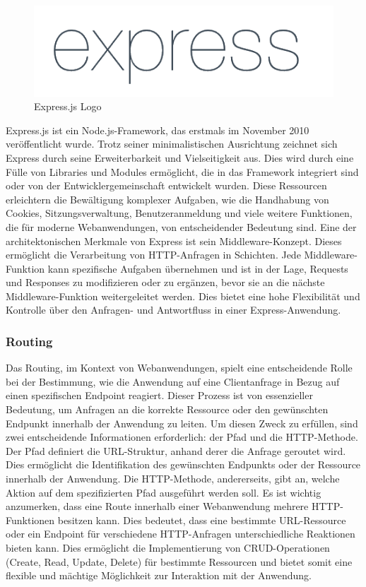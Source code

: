 \begin{figure}[h!]
    \centering
    \includegraphics[width=0.8\linewidth]{pics/express_logo.png}
    \caption{Express.js Logo}
    \label{fig:enter-label}
\end{figure}
Express.js ist ein Node.js-Framework, das erstmals im November 2010 veröffentlicht wurde. Trotz seiner minimalistischen Ausrichtung zeichnet sich Express durch seine Erweiterbarkeit und Vielseitigkeit aus. Dies wird durch eine Fülle von Libraries und Modules ermöglicht, die in das Framework integriert sind oder von der Entwicklergemeinschaft entwickelt wurden. Diese Ressourcen erleichtern die Bewältigung komplexer Aufgaben, wie die Handhabung von Cookies, Sitzungsverwaltung, Benutzeranmeldung und viele weitere Funktionen, die für moderne Webanwendungen, von entscheidender Bedeutung sind.
\newline
Eine der architektonischen Merkmale von Express ist sein Middleware-Konzept. Dieses ermöglicht die Verarbeitung von HTTP-Anfragen in Schichten. Jede Middleware-Funktion kann spezifische Aufgaben übernehmen und ist in der Lage, Requests und Responses zu modifizieren oder zu ergänzen, bevor sie an die nächste Middleware-Funktion weitergeleitet werden. Dies bietet eine hohe Flexibilität und Kontrolle über den Anfragen- und Antwortfluss in einer Express-Anwendung.
\cite{Express_js_Introduction}

\subsubsection{Routing}
Das Routing, im Kontext von Webanwendungen, spielt eine entscheidende Rolle bei der Bestimmung, wie die Anwendung auf eine Clientanfrage in Bezug auf einen spezifischen Endpoint reagiert. Dieser Prozess ist von essenzieller Bedeutung, um Anfragen an die korrekte Ressource oder den gewünschten Endpunkt innerhalb der Anwendung zu leiten. Um diesen Zweck zu erfüllen, sind zwei entscheidende Informationen erforderlich: der Pfad und die HTTP-Methode.
\newline
Der Pfad definiert die URL-Struktur, anhand derer die Anfrage geroutet wird. Dies ermöglicht die Identifikation des gewünschten Endpunkts oder der Ressource innerhalb der Anwendung. Die HTTP-Methode, andererseits, gibt an, welche Aktion auf dem spezifizierten Pfad ausgeführt werden soll. Es ist wichtig anzumerken, dass eine Route innerhalb einer Webanwendung mehrere HTTP-Funktionen besitzen kann. Dies bedeutet, dass eine bestimmte URL-Ressource oder ein Endpoint für verschiedene HTTP-Anfragen unterschiedliche Reaktionen bieten kann. Dies ermöglicht die Implementierung von CRUD-Operationen (Create, Read, Update, Delete) für bestimmte Ressourcen und bietet somit eine flexible und mächtige Möglichkeit zur Interaktion mit der Anwendung.
\cite{Express_js_basic_routing}
\cite{Express_js_routing}

